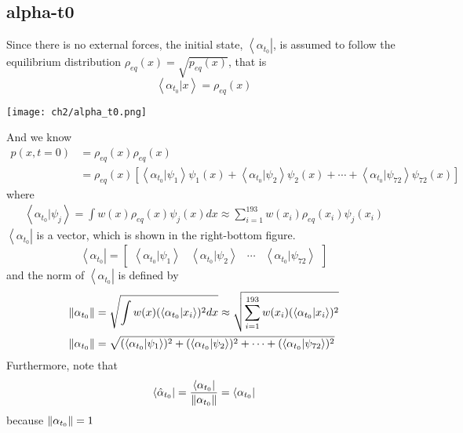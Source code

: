 \subsection{alpha-t0}
\begin{definition}
Since there is no external forces, the initial state, $\left< \alpha_{t_0} \right|$, is assumed to follow the equilibrium distribution $\rho_{eq}(x)=\sqrt{p_{eq}(x)}$, that is
\begin{equation}
        \left< \alpha_{t_0} | x \right> = \rho_{eq}(x)
\end{equation}
\begin{center}
        \texttt{[image: ch2/alpha\_t0.png]}   
\end{center}
And we know
\begin{align*}
        p(x,t=0) &= \rho_{eq}(x) \rho_{eq}(x)\\
        &= \rho_{eq}(x)[\left< \alpha_{t_0} | \psi_1 \right> \psi_1(x) + \left< \alpha_{t_0} | \psi_2 \right>\psi_2(x)+\cdots+\left< \alpha_{t_0} | \psi_{72} \right>\psi_{72}(x)]       
\end{align*}
where
\begin{align*}
        \left< \alpha_{t_0} | \psi_j \right> = \int w(x) \rho_{eq}(x) \psi_j(x) dx \approx \sum_{i=1}^{193} w(x_i) \rho_{eq}(x_i) \psi_j(x_i)
\end{align*}
$\left< \alpha_{t_0} \right|$ is a vector, which is shown in the right-bottom figure.
\begin{equation}
        \left< \alpha_{t_0} \right| = \begin{bmatrix}\left< \alpha_{t_0} | \psi_1 \right> & \left< \alpha_{t_0} | \psi_2 \right> & \cdots & \left< \alpha_{t_0} | \psi_{72} \right> \end{bmatrix}
\end{equation}
and the norm of $\left< \alpha_{t_0} \right|$ is defined by
\begin{align}
        \left\lVert\alpha_{t_0}\right\rVert &=  \sqrt{\int w(x) (\left< \alpha_{t_0} | x_i \right>)^2 dx} \approx \sqrt{ \sum_{i=1}^{193} w(x_i) (\left< \alpha_{t_0} | x_i \right>)^2 } \\
        \left\lVert\alpha_{t_0}\right\rVert &= \sqrt{(\left< \alpha_{t_0} | \psi_1 \right>)^2 + (\left< \alpha_{t_0} | \psi_2 \right>)^2 +\cdots + (\left< \alpha_{t_0} | \psi_{72} \right>)^2}
\end{align}
Furthermore, note that
\begin{equation}
        \left< \hat{\alpha}_{t_0} \right| = \frac{\left< \alpha_{t_{0}} \right|}{\left\lVert\alpha_{t_{0}}\right\rVert} = \left< \alpha_{t_{0}} \right|
\end{equation}
because $\left\lVert\alpha_{t_0}\right\rVert = 1$
\end{definition}

